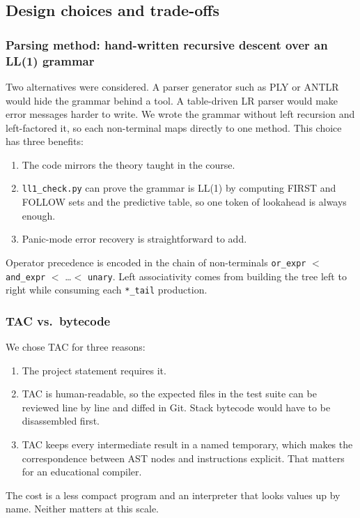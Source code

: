 \documentclass[11pt,letterpaper]{article}
\newcommand{\code}[1]{\texttt{#1}}
\begin{document}
\subsection{Design choices and trade-offs}

\subsubsection*{Parsing method: hand-written recursive descent over an LL(1) grammar}
Two alternatives were considered. A parser generator such as PLY or ANTLR would hide the grammar behind a tool. A table-driven LR parser would make error messages harder to write. We wrote the grammar without left recursion and left-factored it, so each non-terminal maps directly to one method. This choice has three benefits:
\begin{enumerate}
  \item The code mirrors the theory taught in the course.
  \item \code{ll1\_check.py} can prove the grammar is LL(1) by computing FIRST and FOLLOW sets and the predictive table, so one token of lookahead is always enough.
  \item Panic-mode error recovery is straightforward to add.
\end{enumerate}
Operator precedence is encoded in the chain of non-terminals \code{or\_expr} $<$ \code{and\_expr} $<$ \ldots $<$ \code{unary}. Left associativity comes from building the tree left to right while consuming each \code{*\_tail} production.

\subsubsection*{TAC vs.\ bytecode}
We chose TAC for three reasons:
\begin{enumerate}
  \item The project statement requires it.
  \item TAC is human-readable, so the expected files in the test suite can be reviewed line by line and diffed in Git. Stack bytecode would have to be disassembled first.
  \item TAC keeps every intermediate result in a named temporary, which makes the correspondence between AST nodes and instructions explicit. That matters for an educational compiler.
\end{enumerate}
The cost is a less compact program and an interpreter that looks values up by name. Neither matters at this scale.
\end{document}
